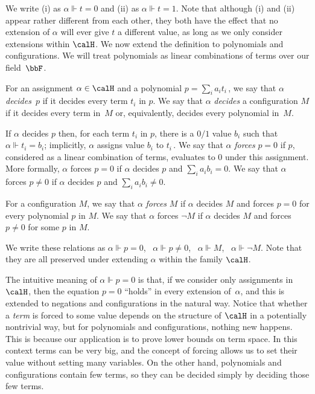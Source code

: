 \documentclass{toc}
\begin{document}
We write (i) as $\alpha \Vdash t=0$ and (ii) as $\alpha \Vdash t=1$.
Note that although (i) and  (ii) appear rather different from each other, they both have
the effect that no extension of $\alpha$ will ever give $t$ a different value,
as long as we only consider extensions within $\calH$.
We now extend the definition to polynomials and configurations.
We will treat polynomials as  linear combinations of terms over our field~$\bbF$.

\begin{definition}\label{def:forcing}
For an assignment $\alpha \in \calH$ and a polynomial $p=\sum_{i}a_i t_i$\,,
we say that $\alpha$ \emph{decides}~$p$ if it decides every term $t_i$ in $p$.
We say that $\alpha$ \emph{decides} a configuration $M$ if it decides every term in~$M$
or, equivalently, decides every polynomial in~$M$.

If $\alpha$ decides $p$ then, for each term $t_i$ in $p$, there is a $0/1$ value
$b_i$ such that $\alpha \Vdash t_i=b_i$; implicitly, $\alpha$ assigns value $b_i$ to $t_i$\,. 
We say that $\alpha$ \emph{forces} $p=0$ 
if $p$, considered as a linear combination of terms, evaluates to $0$ under this assignment.
More formally, $\alpha$ forces $p=0$ if $\alpha$ decides $p$ and $\sum_{i} a_ib_i =0$.
We say that $\alpha$ forces $p \neq 0$ if $\alpha$ decides $p$ and $\sum_{i} a_ib_i \neq 0$.

For a configuration $M$, we say that $\alpha$ \emph{forces} $M$ if $\alpha$ decides
$M$ and forces $p=0$ for every polynomial $p$ in $M$. We say that 
$\alpha$ forces $\neg M$ if $\alpha$ decides $M$ and forces $p \neq 0$ for some $p$ in $M$.
\end{definition}

We write these relations as $\alpha \Vdash p=0$, \ $\alpha \Vdash p \neq 0$, \
$\alpha \Vdash M$, \ $\alpha \Vdash \neg M$.
 Note that 
they are all preserved under extending $\alpha$ within the family $\calH$.

The intuitive meaning of $\alpha \Vdash p=0$ is that, if we consider only assignments in $\calH$,
then the equation $p=0$ ``holds'' in every extension of~$\alpha$, and this 
is extended to negations and configurations in the natural way.
Notice that whether a \emph{term} is forced to some value depends on the structure of $\calH$
in a potentially nontrivial way, but for polynomials and configurations, nothing new happens. 
This is because our application is to prove lower bounds on term space. 
In this context terms can be very big, and the concept of forcing allows us
to set their value without setting  many variables. On the other hand, 
polynomials and configurations contain few terms, so they can be decided simply by deciding those few terms.
\end{document}
